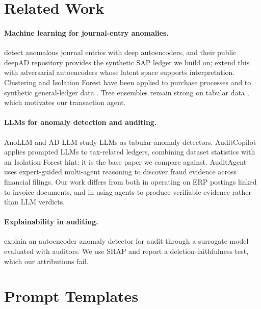 \documentclass{article}
\begin{document}



\appendix

\section{Related Work}

\paragraph{Machine learning for journal-entry anomalies.} \citet{schreyer2017detection} detect anomalous journal entries with deep autoencoders, and their public deepAD repository provides the synthetic SAP ledger we build on; \citet{schreyer2019adversarial} extend this with adversarial autoencoders whose latent space supports interpretation. Clustering and Isolation Forest have been applied to purchase processes \citep{herreros2025applied} and to synthetic general-ledger data \citep{gronewald2024anomaly}. Tree ensembles remain strong on tabular data \citep{grinsztajn2022tree}, which motivates our transaction agent.

\paragraph{LLMs for anomaly detection and auditing.} AnoLLM \citep{tsai2025anollm} and AD-LLM \citep{yang2024adllm} study LLMs as tabular anomaly detectors. AuditCopilot \citep{kadir2025auditcopilot} applies prompted LLMs to tax-related ledgers, combining dataset statistics with an Isolation Forest hint; it is the base paper we compare against. AuditAgent \citep{bai2025auditagent} uses expert-guided multi-agent reasoning to discover fraud evidence across financial filings. Our work differs from both in operating on ERP postings linked to invoice documents, and in using agents to produce verifiable evidence rather than LLM verdicts.

\paragraph{Explainability in auditing.} \citet{gnoss2022xai} explain an autoencoder anomaly detector for audit through a surrogate model evaluated with auditors. We use SHAP \citep{lundberg2017unified} and report a deletion-faithfulness test, which our attributions fail.

\section{Prompt Templates}
\label{app:prompts}
\end{document}
